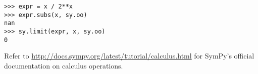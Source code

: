 \begin{lstlisting}
>>> expr = x / 2**x
>>> expr.subs(x, sy.oo)
nan
>>> sy.limit(expr, x, sy.oo)
0
\end{lstlisting}

Refer to \url{http://docs.sympy.org/latest/tutorial/calculus.html} for SymPy's official documentation on calculus operations.

\begin{comment} %
\subsection*{Series Expansions} %

Series can be depicted using the summation function, but SymPy also has built-in functions to depict them.
Expressions involving series can be created using \li{series()} as a function or as a method.
The function takes in the expression, variable, the point the series is centered at, and the order of the series.
The point the series is centered at defaults to zero and the order to six.

\begin{lstlisting}
# Find the terms in the series for cos(x) centered around x = 0 of order 6.
>>> sy.series(sy.cos(x),x)
1 - x**2/2 + x**4/24 + O(x**6)

# Center the series at x = pi of order 4.
>>> sy.series(sy.cos(x),x,sy.pi, 4)
-1 + (x - pi)**2/2 + O((x - pi)**4, (x,pi))

# Use removeO() to remove the order from the output.
>>> sy.series(sy.exp(sy.cos(x)),x,1,2).removeO()
-(x - 1)*exp(cos(1))*sin(1) + exp(cos(1))
\end{lstlisting}

Power series can be represented in SymPy with the ``Formal Power Series'' class.
When an \li{fps} object is created, it returns sequences of coefficients and powers, followed by the independent and then the common terms.
Use the \li{truncate()} or \li{polynomial()} methods to visualize individual terms of the series.
These methods input the highest order to be visualized and default to six.

\begin{lstlisting}
>>> f = sy.fps(sy.cos(x),x)
>>> f.truncate()
1 - x**2/2 + x**4/24 + O(x**6)
>>> f.polynomial()
x**4/24 - x**2/2 + 1
\end{lstlisting}

Further series features in SymPy include the computation of residues, laurent series and fourier series.
\end{comment}

